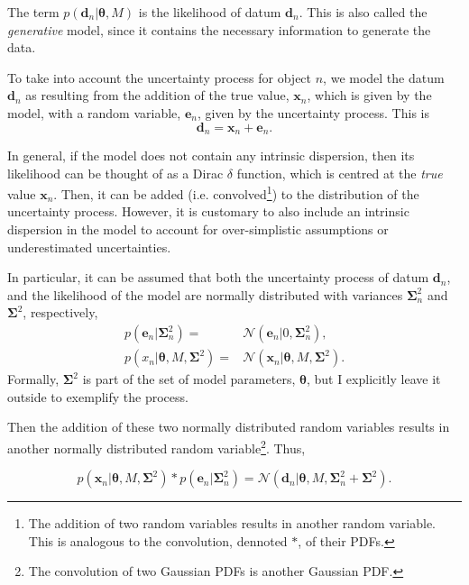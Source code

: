 The term $p(\mathbf{d}_n|\boldsymbol{\theta},M)$ is the likelihood of datum $\mathbf{d}_n$. This is also called the \emph{generative} model, since it contains the necessary information to generate the data. 


To take into account the uncertainty process for object $n$, we model the datum $\mathbf{d}_n$ as resulting from the addition of the true value, $\mathbf{x}_n$, which is given by the model, with a random variable, $\mathbf{e}_n$, given by the uncertainty process. This is
\begin{equation}
\mathbf{d}_n = \mathbf{x}_n + \mathbf{e}_n. \nonumber
\end{equation}

In general, if the model does not contain any intrinsic dispersion, then its likelihood can be thought of as a Dirac $\delta$ function, which is centred at the \emph{true} value $\mathbf{x}_n$. Then, it can be added (i.e. convolved\footnote{The addition of two random variables results in another random variable. This is analogous  to the convolution, dennoted $*$, of their PDFs.}) to the distribution of the uncertainty process. However, it is customary to also include an intrinsic dispersion in the model to account for over-simplistic assumptions or underestimated uncertainties. 

In particular, it can be assumed that both the uncertainty process of datum $\mathbf{d}_n$, and the likelihood of the model are normally distributed with variances $\boldsymbol{\Sigma}_n^2$ and $\boldsymbol{\Sigma}^2$, respectively, 
\begin{align}
p(\mathbf{e}_n|\mathbf{\Sigma}_n^2)= &\mathcal{N}(\mathbf{e}_n|0,\boldsymbol{\Sigma}_n^2), \nonumber\\
p(x_n|\boldsymbol{\theta},M,\mathbf{\Sigma}^2)= &\mathcal{N}(\mathbf{x}_n|\boldsymbol{\theta},M,\boldsymbol{\Sigma}^2).\nonumber
\end{align}
Formally, $\boldsymbol{\Sigma}^2$ is part of the set of model parameters, $\boldsymbol{\theta}$, but I explicitly leave it outside to exemplify the process. 

Then the addition of these two normally distributed random variables results in another normally distributed random variable\footnote{The convolution of two Gaussian PDFs is another Gaussian PDF.}. Thus,

\begin{equation}
p(\mathbf{x}_n|\boldsymbol{\theta},M,\boldsymbol{\Sigma}^2)*p(\mathbf{e}_n|\boldsymbol{\Sigma}_n^2) = \mathcal{N}(\mathbf{d}_n|\boldsymbol{\theta},M,\boldsymbol{\Sigma}_n^2+\boldsymbol{\Sigma}^2).
\end{equation}

